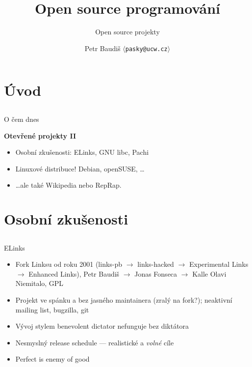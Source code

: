 \documentclass{beamer}
\begin{document}

\title{Open source programování}
\subtitle{Open source projekty}
\author{Petr Baudiš $\langle${\tt pasky@ucw.cz}$\rangle$}
\date{}
\frame{\titlepage}

\section{Úvod}

\subsection{}
\begin{frame}{O čem dnes}
\begin{center}
{\bf Otevřené projekty II}
\end{center}
\begin{itemize}
\item Osobní zkušenosti: ELinks, GNU libc, Pachi
\item Linuxové distribuce! Debian, openSUSE, \dots
\item \dots ale také Wikipedia nebo RepRap.
\end{itemize}
\end{frame}


\section{Osobní zkušenosti}

\subsection{}
\begin{frame}{ELinks}
\begin{itemize}
\item Fork Linksu od roku 2001 (links-pb $\to$ links-hacked $\to$ Experimental Links $\to$ Enhanced Links), Petr Baudiš $\to$ Jonas Fonseca $\to$ Kalle Olavi Niemitalo, GPL
\item Projekt ve spánku a bez jasného maintainera (zralý na fork?); neaktivní mailing list, bugzilla, git
\item Vývoj stylem benevolent dictator nefunguje bez diktátora
\item Nesmyslný release schedule --- realistické a {\em volné} cíle
\item Perfect is enemy of good
\end{itemize}
\end{frame}
\end{document}
